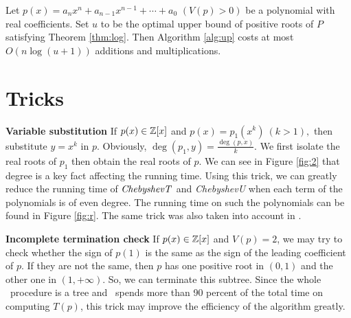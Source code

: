 \begin{corollary}
  Let $p(x)=a_nx^n+a_{n-1}x^{n-1}+\cdots+a_0$ $ (V(p)> 0)$ be a polynomial with real coefficients. Set $u$ to be the optimal upper bound of positive roots of $P$ satisfying Theorem
  \ref{thm:log}. Then  Algorithm \ref{alg:up} costs at most $O(n\log(u+1))$  additions and multiplications.
\end{corollary}


\section{Tricks}
{\bf Variable substitution}
If $p(x)\in {\mathbb Z}[x]$ and $p(x)=p_1(x^k)\ (k>1),$ then substitute $y=x^k$ in $p$. Obviously, $\deg(p_1,y)=\frac{\deg(p,x)}{k}$. We first isolate the real roots of $p_1$ then
obtain the real roots of $p$. We can see in Figure \ref{fig:2} that degree is a key fact affecting the running time. Using this trick, we can greatly reduce the running time of ${\it ChebyshevT}$
and {\it ChebyshevU} when each term of the polynomials is of even degree. The running time on such the polynomials can be found in Figure \ref{fig:r}. The same trick was also taken into account in \cite{johnson06}.

{\bf Incomplete termination check}
If $p(x)\in {\mathbb Z}[x]$ and $V(p)= 2$, we may try to check whether the sign of $p(1)$ is the same as the sign of the leading coefficient of $p$. If they are not the same, then $p$  has one positive root in $(0,1)$ and the other one in $(1,+\infty)$. So, we can terminate this subtree. Since the whole \froot\ procedure is a tree and \froot\ spends more than 90 percent of the
total time on computing $T(p)$, this trick may improve the efficiency of the algorithm greatly.